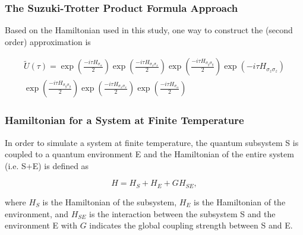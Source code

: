 \documentclass{beamer}
\begin{document}
\begin{frame}
	\frametitle{The Suzuki-Trotter Product Formula Approach}
	Based on the Hamiltonian used in this study, one way to construct the (second order) approximation is 
	
	\begin{equation*}
	\label{tilde_U}
	\begin{split}
	\tilde{U}(\tau) = \exp(\frac{-i\tau H_{\sigma_\alpha}}{2})\exp(\frac{-i\tau H_{\sigma_x \sigma_x}}{2})\exp(\frac{-i\tau H_{\sigma_y \sigma_y}}{2})\exp(-i\tau H_{\sigma_z \sigma_z})\\\exp(\frac{-i\tau H_{\sigma_y \sigma_y}}{2})\exp(\frac{-i\tau H_{\sigma_x \sigma_x}}{2})\exp(\frac{-i\tau H_{\sigma_\alpha}}{2})
	\end{split}
	\end{equation*}

\end{frame}







\begin{frame}
	\frametitle{Hamiltonian for a System at Finite Temperature}
	In order to simulate a system at finite temperature, the quantum subsystem S is coupled to a quantum environment E and the Hamiltonian of the entire system (i.e. S+E) is defined as
	
	\begin{equation*}
	H = H_S + H_E + GH_{SE},
	\end{equation*} 
	
	where $H_S$ is the Hamiltonian of the subsystem, $H_E$ is the Hamiltonian of the environment, and $H_{SE}$ is the interaction between the subsystem S and the environment E with $G$ indicates the global coupling strength between S and E. 
\end{frame}
\end{document}
